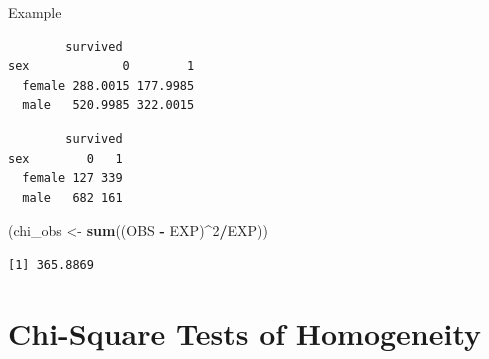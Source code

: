 \documentclass[
  ignorenonframetext,
]{beamer}
\newenvironment{Shaded}{\begin{snugshade}}{\end{snugshade}}
\newcommand{\DecValTok}[1]{\textcolor[rgb]{0.00,0.00,0.81}{#1}}
\newcommand{\FunctionTok}[1]{\textcolor[rgb]{0.13,0.29,0.53}{\textbf{#1}}}
\newcommand{\NormalTok}[1]{#1}
\newcommand{\OtherTok}[1]{\textcolor[rgb]{0.56,0.35,0.01}{#1}}
\newcommand{\SpecialCharTok}[1]{\textcolor[rgb]{0.81,0.36,0.00}{\textbf{#1}}}
\begin{document}
\begin{frame}[fragile]{Example}
\protect\hypertarget{example-1}{}
\begin{Shaded}
\end{Shaded}

\begin{verbatim}
        survived
sex             0        1
  female 288.0015 177.9985
  male   520.9985 322.0015
\end{verbatim}

\begin{Shaded}
\end{Shaded}

\begin{verbatim}
        survived
sex        0   1
  female 127 339
  male   682 161
\end{verbatim}

\begin{Shaded}
\begin{Highlighting}[]
\NormalTok{(chi\_obs }\OtherTok{\textless{}{-}} \FunctionTok{sum}\NormalTok{((OBS }\SpecialCharTok{{-}}\NormalTok{ EXP)}\SpecialCharTok{\^{}}\DecValTok{2}\SpecialCharTok{/}\NormalTok{EXP))}
\end{Highlighting}
\end{Shaded}

\begin{verbatim}
[1] 365.8869
\end{verbatim}
\end{frame}

\hypertarget{chi-square-tests-of-homogeneity}{%
\section{Chi-Square Tests of
Homogeneity}\label{chi-square-tests-of-homogeneity}}
\end{document}
